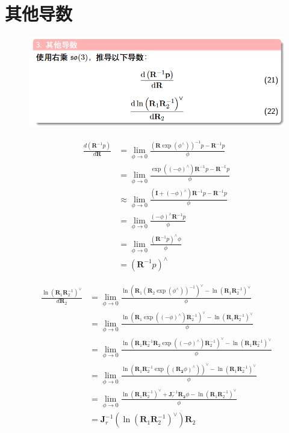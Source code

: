 \documentclass[11pt,twoside,a4paper]{article}
\begin{document}
\section{其他导数}
\begin{figure}[h!]
    \centering
    \includegraphics[width=0.9\linewidth]{004.png}
\end{figure}
\begin{align}
    \frac{d(\textbf{R}^{-1}p)}{d\textbf{R}}
    &=\lim_{\phi \to 0}{\frac{(\textbf{R} \exp(\phi^{\wedge}) )^{-1}p - \textbf{R}^{-1}p}{\phi}} \\
    &=\lim_{\phi \to 0}{\frac{ \exp((-\phi)^{\wedge}) \textbf{R}^{-1}  p - \textbf{R}^{-1}p}{\phi}} \\
    &\approx \lim_{\phi \to 0}{\frac{ (\textbf{I} + (-\phi)^{\wedge}) \textbf{R}^{-1}  p - \textbf{R}^{-1}p}{\phi}} \\
    &= \lim_{\phi \to 0}{\frac{ (-\phi)^{\wedge} \textbf{R}^{-1}  p}{\phi}} \\
    &= \lim_{\phi \to 0}{\frac{ (\mathbf{R}^{-1}p)^{\wedge}\phi}{\phi}}\\
    &= (\mathbf{R}^{-1}p)^{\wedge}
\end{align}

\begin{align}
    \frac{\ln(\mathbf{R}_1\mathbf{R}_2^{-1})^\vee}{d\mathbf{R}_2} 
    &= \lim_{\phi \to 0} 
    \frac{\ln(\mathbf{R}_1(\mathbf{R}_2\exp(\phi^\wedge))^{-1})^\vee - \ln(\mathbf{R}_1\mathbf{R}_2^{-1})^\vee}{\phi} \\
    &= \lim_{\phi \to 0} 
    \frac{\ln(\mathbf{R}_1\exp((-\phi)^\wedge)\mathbf{R}_2^{-1})^\vee - \ln(\mathbf{R}_1\mathbf{R}_2^{-1})^\vee}{\phi} \\
    &= \lim_{\phi \to 0} 
    \frac{\ln(\mathbf{R}_1\mathbf{R}_2^{-1}\mathbf{R}_2\exp((-\phi)^\wedge)\mathbf{R}_2^{-1})^\vee - \ln(\mathbf{R}_1\mathbf{R}_2^{-1})^\vee}{\phi} \\
    &= \lim_{\phi \to 0}
    \frac{\ln(\mathbf{R}_1\mathbf{R}_2^{-1}\exp((\mathbf{R_2}\phi)^\wedge))^\vee - \ln(\mathbf{R}_1\mathbf{R}_2^{-1})^\vee}{\phi} \\
    &= \lim_{\phi \to 0}
    \frac{\ln(\mathbf{R}_1\mathbf{R}_2^{-1})^\vee + \mathbf{J}_r^{-1} \mathbf{R_2}\phi - \ln(\mathbf{R}_1\mathbf{R}_2^{-1})^\vee}{\phi} \\
    &= \mathbf{J}_r^{-1}(\ln{(\mathbf{R}_1\mathbf{R}_2^{-1})^\vee}) \mathbf{R}_2
\end{align}
\end{document}
